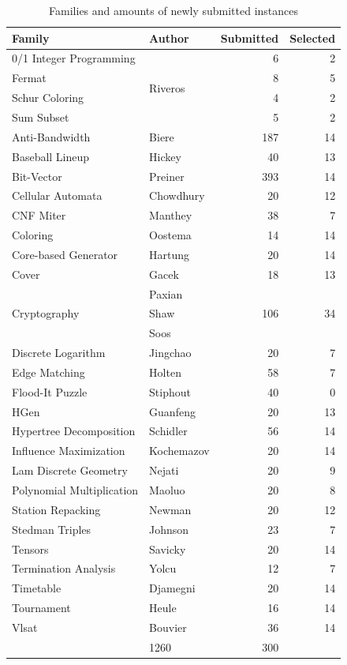\documentclass{elsarticle}
\begin{document}
\begin{table}[t]
\small
\centering
\begin{tabular}{llrr}
\bf Family & \bf Author & \bf Submitted & \bf Selected\\
\hline
\arrayrulecolor{lightgray}
0/1 Integer Programming & \multirow{4}{*}{Riveros} & 6 & 2 \\
Fermat &  & 8 & 5 \\
Schur Coloring &  & 4 & 2 \\
Sum Subset &  & 5 & 2 \\
\hline
Anti-Bandwidth & Biere & 187 & 14 \\
Baseball Lineup & Hickey & 40 & 13 \\
Bit-Vector & Preiner & 393 & 14 \\
Cellular Automata & Chowdhury & 20 & 12 \\
CNF Miter & Manthey & 38 & 7 \\
Coloring & Oostema & 14 & 14 \\
Core-based Generator & Hartung & 20 & 14 \\
Cover & Gacek & 18 & 13 \\
\hline
\multirow{3}{*}{Cryptography} & Paxian & \multirow{3}{*}{106} & \multirow{3}{*}{34} \\
 & Shaw &  &  \\
 & Soos &  &  \\
\hline
Discrete Logarithm & Jingchao & 20 & 7 \\
Edge Matching & Holten & 58 & 7 \\
Flood-It Puzzle & Stiphout & 40 & 0 \\
HGen & Guanfeng & 20 & 13 \\
Hypertree Decomposition & Schidler & 56 & 14 \\
Influence Maximization & Kochemazov & 20 & 14 \\
Lam Discrete Geometry & Nejati & 20 & 9 \\
Polynomial Multiplication & Maoluo & 20 & 8 \\
Station Repacking & Newman & 20 & 12 \\
Stedman Triples & Johnson & 23 & 7 \\
Tensors & Savicky & 20 & 14 \\
Termination Analysis & Yolcu & 12 & 7 \\
Timetable & Djamegni & 20 & 14 \\
Tournament & Heule & 16 & 14 \\
Vlsat & Bouvier & 36 & 14 \\
\arrayrulecolor{black}
\hline
\multicolumn{2}{r}{$\Sigma$} & 1260 & 300
\end{tabular}
\caption{Families and amounts of newly submitted instances}
\label{tab:families}
\end{table}
\end{document}
